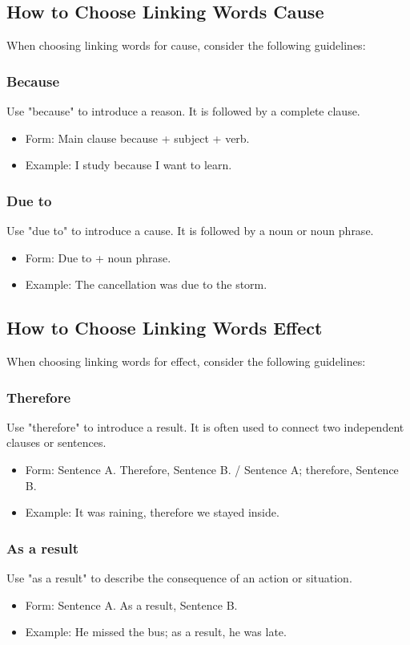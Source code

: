 \subsection{How to Choose Linking Words Cause}


When choosing linking words for cause, consider the following guidelines:

\subsubsection{Because}
Use "because" to introduce a reason. It is followed by a complete clause.
\begin{itemize}
    \item Form: Main clause because + subject + verb.
    \item Example: I study because I want to learn.
\end{itemize}

\subsubsection{Due to}
Use "due to" to introduce a cause. It is followed by a noun or noun phrase.
\begin{itemize}
    \item Form: Due to + noun phrase.
    \item Example: The cancellation was due to the storm.
\end{itemize}


\subsection{How to Choose Linking Words Effect}


When choosing linking words for effect, consider the following guidelines:

\subsubsection{Therefore}
Use "therefore" to introduce a result. It is often used to connect two independent clauses or sentences.
\begin{itemize}
    \item Form: Sentence A. Therefore, Sentence B. / Sentence A; therefore, Sentence B.
    \item Example: It was raining, therefore we stayed inside.
\end{itemize}

\subsubsection{As a result}
Use "as a result" to describe the consequence of an action or situation.
\begin{itemize}
    \item Form: Sentence A. As a result, Sentence B.
    \item Example: He missed the bus; as a result, he was late.
\end{itemize}

